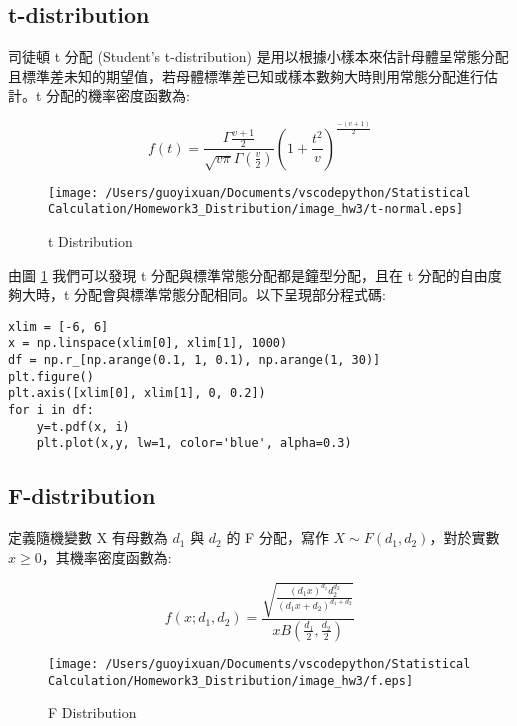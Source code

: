 \subsection{t-distribution}

司徒頓 t 分配 (Student's t-distribution) 是用以根據小樣本來估計母體呈常態分配且標準差未知的期望值，若母體標準差已知或樣本數夠大時則用常態分配進行估計。t 分配的機率密度函數為:

\begin{equation}
f(t)=\frac{\Gamma{\frac{v+1}{2}}}{\sqrt{v\pi}\Gamma(\frac{v}{2})}(1+\frac{t^2}{v})^{\frac{-(v+1)}{2}}
\end{equation}

\begin{figure}[H]
    \centering
        \texttt{[image: /Users/guoyixuan/Documents/vscodepython/Statistical Calculation/Homework3\_Distribution/image\_hw3/t-normal.eps]}
    \caption{t Distribution}
    \label{t-normal}
\end{figure}

由圖 \ref{t-normal} 我們可以發現 t 分配與標準常態分配都是鐘型分配，且在 t 分配的自由度夠大時，t 分配會與標準常態分配相同。以下呈現部分程式碼:

\bigskip
\begin{lstlisting}
xlim = [-6, 6]
x = np.linspace(xlim[0], xlim[1], 1000)
df = np.r_[np.arange(0.1, 1, 0.1), np.arange(1, 30)]
plt.figure()
plt.axis([xlim[0], xlim[1], 0, 0.2])
for i in df:
    y=t.pdf(x, i)
    plt.plot(x,y, lw=1, color='blue', alpha=0.3)
\end{lstlisting}

\subsection{F-distribution}
定義隨機變數 X 有母數為 $d_1$ 與 $d_2$ 的 F 分配，寫作 $X \sim F(d_1,d_2)$，對於實數 $x \geq 0$，其機率密度函數為:

\begin{equation}
f(x;d_1,d_2)=\frac{\sqrt{\frac{(d_1 x)^{d_1} d_2^{d_2}}{(d_1 x+d_2)^{d_1+d_2}}}}{x B(\frac{d_1}{2},\frac{d_2}{2})}
\end{equation}

\begin{figure}[H]
    \centering
        \texttt{[image: /Users/guoyixuan/Documents/vscodepython/Statistical Calculation/Homework3\_Distribution/image\_hw3/f.eps]}
    \caption{F Distribution}
    \label{F}
\end{figure}

